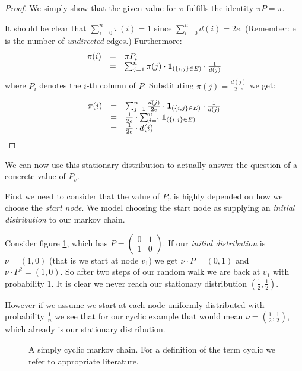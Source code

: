 \begin{proof}
We simply show that the given value for $\pi$ fulfills the identity $\pi P = \pi$.

It should be clear that $\sum_{i=0}^{n} \pi(i) = 1$ since $\sum_{i=0}^{n} d(i) = 2e$.
(Remember: e is the number of {\em undirected} edges.)
Furthermore:
$$
\begin{array}{rcl}
\pi(i) & = & \pi P_i \\
       & = & \sum_{j=1}^{n} \pi(j) \cdot \text{\textbf{1}}_{(\{i, j\} \in E)} \cdot \frac{1}{d(j)} \\
\end{array}
$$
where $P_i$ denotes the $i$-th column of $P$.
Substituting $\pi(j) = \frac{d(j)}{2 \cdot e}$ we get:

$$
\begin{array}{rcl}
\pi(i) & = & \sum_{j=1}^{n} \frac{d(j)}{2e} \cdot \text{\textbf{1}}_{(\{i, j\} \in E)} \cdot \frac{1}{d(j)} \\
       & = & \frac{1}{2e} \cdot \sum_{j=1}^{n} \text{\textbf{1}}_{(\{i, j\} \in E)} \\
       & = & \frac{1}{2e} \cdot d(i)
\end{array}
$$
\end{proof}

We can now use this stationary distribution to actually answer the
question of a concrete value of $P_v$.

First we need to consider that the value of $P_v$ is highly depended on
how we choose the \emph{start node}. We model choosing the start node as
supplying an \emph{initial distribution} to our markov chain.

Consider figure \ref{cyclic-graph}, which has
$P = \left(\begin{matrix}0 & 1\\ 1 & 0\end{matrix}\right)$. If our
\emph{initial distribution} is $\nu = (1, 0)$ (that is we start at node
$v_1$) we get $\nu \cdot P = (0, 1)$ and $\nu \cdot P^2 = (1, 0)$. So
after two steps of our random walk we are back at $v_1$ with probability
1. It is clear we never reach our stationary distribution
$(\frac{1}{2}, \frac{1}{2})$.

However if we assume we start at each node uniformly distributed with
probability $\frac{1}{n}$ we see that for our cyclic example that would
mean $\nu = (\frac{1}{2}, \frac{1}{2})$, which already is our stationary
distribution.

\begin{figure}
\caption{A simply cyclic markov chain. For a definition of the term cyclic we refer to appropriate literature.}
\label{cyclic-graph}
\end{figure}


